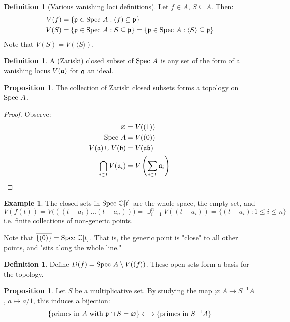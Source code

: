 \documentclass[10pt,reqno]{amsart}
\theoremstyle{definition}
\newtheorem{example}[theorem]{Example}
\newtheorem{definition}[theorem]{Definition}
\newtheorem{proposition}[theorem]{Proposition}
\theoremstyle{remark}
\numberwithin{equation}{section}
\numberwithin{theorem}{section}
\newcommand{\C}{{\mathbb C}}
\newcommand{\spec}{\textup{Spec }}
\newcommand{\fraka}{\frak{a}}
\newcommand{\frakb}{\frak{b}}
\newcommand{\pp}{\frak{p}}
\begin{document}
\begin{definition}[Various vanishing loci definitions] Let $f \in A$, $S \subseteq A$. Then:
\begin{align*}
V(f) &= \{\pp \in \spec A: (f) \subseteq \pp\}\\
V(S) &= \{\pp \in \spec A : S \subseteq \pp\} = \{\pp \in \spec A : \langle S \rangle \subseteq \pp\}
\end{align*}
Note that $V(S) = V(\langle S \rangle)$.
\end{definition}

\begin{definition} A (Zariski) closed subset of $\spec A$ is any set of the form of a vanishing locus $V(\fraka)$ for $\fraka$ an ideal.
\end{definition}

\begin{proposition} The collection of Zariski closed subsets forms a topology on $\spec A$.
\end{proposition}
\begin{proof}
Observe:
\begin{align*}
\varnothing &= V((1))\\
\spec A &= V((0))\\
V(\fraka) \cup V(\frakb) &= V(\fraka \frakb)\\
\bigcap_{i \in I} V(\fraka_i) &= V\left( \sum_{i \in I} \fraka_i \right)
\end{align*}
\end{proof}
\begin{example} The closed sets in $\spec \C[t]$ are the whole space, the empty set, and 
\[V(f(t)) = V\big(((t-a_1) \dots (t-a_n))\big) = \cup_{i=1}^n V((t-a_i)) = \{(t-a_i) : 1 \le i \le n\}\]
i.e. finite collections of non-generic points.

Note that $\overline{\{(0)\}} = \spec \C[t]$. That is, the generic point is "close" to all other points, and "sits along the whole line."
\end{example}

\begin{definition} Define $D(f) = \spec A \setminus V((f))$. These open sets form a basis for the topology.
\end{definition}

\begin{proposition} Let $S$ be a multiplicative set. By studying the map $\varphi: A \to S^{-1}A$, $a \mapsto a/1$, this induces a bijection:
\[\{\textup{primes in $A$ with $\pp \cap S = \varnothing$}\} \longleftrightarrow \{\textup{primes in $S^{-1}A$}\}\]
\end{proposition}
\end{document}
